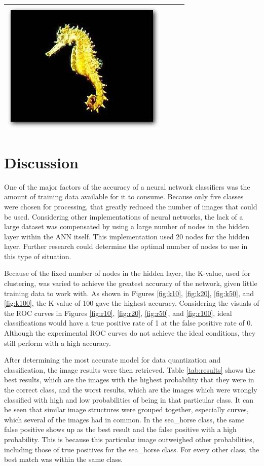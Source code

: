 \documentclass{article}
\begin{document}
\begin{table}[Ht]
\begin{tabular}{| c | c | c | c |}
\vspace{0cm}\includegraphics[scale=.1]{"Figures/False Matches/class_5_least_sure_wrong"} \\
\hline
\end{tabular}
\end{table}
%
\section{Discussion}
\label{sec:discussion}
One of the major factors of the accuracy of a neural network classifiers was the amount of training data available for it to consume. Because only five classes were chosen for processing, that greatly reduced the number of images that could be used. Considering other implementations of neural networks, the lack of a large dataset was compensated by using a large number of nodes in the hidden layer within the ANN itself. This implementation used 20 nodes for the hidden layer. Further research could determine the optimal number of nodes to use in this type of situation. 

Because of the fixed number of nodes in the hidden layer, the K-value, used for clustering, was varied to achieve the greatest accuracy of the network, given little training data to work with. As shown in Figures \ref{fig:k10}, \ref{fig:k20}, \ref{fig:k50}, and \ref{fig:k100}, the K-value of 100 gave the highest accuracy. Considering the visuals of the ROC curves in Figures \ref{fig:r10}, \ref{fig:r20}, \ref{fig:r50}, and \ref{fig:r100}, ideal classifications would have a true positive rate of 1 at the false positive rate of 0. Although the experimental ROC curves do not achieve the ideal conditions, they still perform with a high accuracy.

After determining the most accurate model for data quantization and classification, the image results were then retrieved. Table \ref{tab:results} shows the best results, which are the images with the highest probability that they were in the correct class, and the worst results, which are the images which were wrongly classified with high and low probabilities of being in that particular class. It can be seen that similar image structures were grouped together, especially curves, which several of the images had in common. In the sea\_horse class, the same false positive shows up as the best result and the false positive with a high probability. This is because this particular image outweighed other probabilities, including those of true positives for the sea\_horse class. For every other class, the best match was within the same class.
\end{document}
